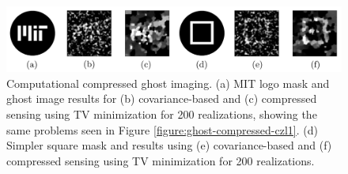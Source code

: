 \begin{figure}[t]
\begin{center}
\includegraphics[width=15cm]{figure-ghost-ccgi.pdf}
\caption{Computational compressed ghost imaging. (a) MIT logo mask and ghost image results for (b) covariance-based and (c) compressed sensing using TV minimization for 200 realizations, showing the same problems seen in Figure \ref{figure:ghost-compressed-czl1}. (d) Simpler square mask and results using (e) covariance-based and (f) compressed sensing using TV minimization for 200 realizations.}
\label{figure:ghost-ccgi}
\end{center}
\end{figure}

